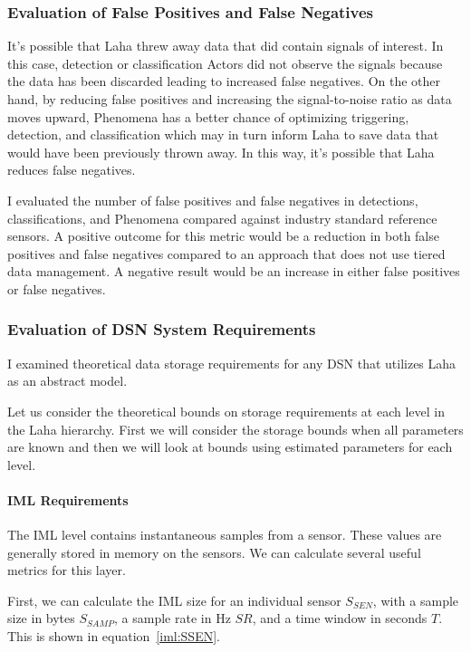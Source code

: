 \subsubsection{Evaluation of False Positives and False Negatives}\label{eval-fp-fn}
It's possible that Laha threw away data that did contain signals of interest. In this case, detection or classification Actors did not observe the signals because the data has been discarded leading to increased false negatives. On the other hand, by reducing false positives and increasing the signal-to-noise ratio as data moves upward, Phenomena has a better chance of optimizing triggering, detection, and classification which may in turn inform Laha to save data that would have been previously thrown away. In this way, it's possible that Laha reduces false negatives.

I evaluated the number of false positives and false negatives in detections, classifications, and Phenomena compared against industry standard reference sensors. A positive outcome for this metric would be a reduction in both false positives and false negatives compared to an approach that does not use tiered data management. A negative result would be an increase in either false positives or false negatives.

\subsubsection{Evaluation of DSN System Requirements}
I examined theoretical data storage requirements for any DSN that utilizes Laha as an abstract model.

Let us consider the theoretical bounds on storage requirements at each level in the Laha hierarchy. First we will consider the storage bounds when all parameters are known and then we will look at bounds using estimated parameters for each level.

\paragraph{IML Requirements}
The IML level contains instantaneous samples from a sensor. These values are generally stored in memory on the sensors. We can calculate several useful metrics for this layer.

First, we can calculate the IML size for an individual sensor $S_{SEN}$, with a sample size in bytes $S_{SAMP}$, a sample rate in Hz $SR$, and a time window in seconds $T$. This is shown in equation~\ref{iml:SSEN}.

